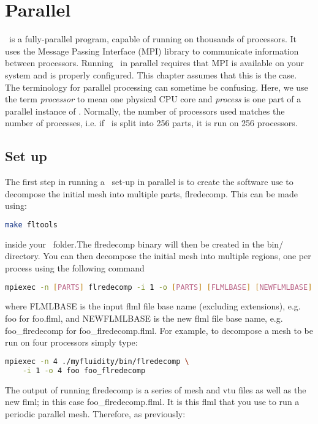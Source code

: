 \chapter{Parallel}

\fluidity\ is a fully-parallel program, capable of running on thousands of processors. 
It uses the Message Passing Interface (MPI) library to communicate information between 
processors. Running \fluidity\ in parallel requires that MPI is available on your system
and is properly configured. This chapter assumes that this is the case. The 
terminology for parallel processing can sometime be confusing. Here, we use the 
term \emph{processor} to mean one physical CPU core and \emph{process} is one part
of a parallel instance of \fluidity. Normally, the number of processors used matches
the number of processes, i.e. if \fluidity\ is split into 256 parts, it is run on 256 processors.

\section{Set up}

The first step in running a \fluidity\ set-up in parallel is to create the software
use to decompose the initial mesh into multiple parts, flredecomp. This can be made using:
\begin{lstlisting}[language=bash]
make fltools
\end{lstlisting}
inside your \fluidity\ folder.The flredecomp binary will then be created in the bin/ directory. 
You can then decompose the initial mesh into multiple regions, one per process using the following command
\begin{lstlisting}[language=bash]
mpiexec -n [PARTS] flredecomp -i 1 -o [PARTS] [FLMLBASE] [NEWFLMLBASE]
\end{lstlisting}
where FLMLBASE is the \fluidity input flml file base name (excluding
extensions), e.g. foo for foo.flml, and NEWFLMLBASE is the new flml
file base name, e.g. foo\_flredecomp for foo\_flredecomp.flml.  For
example, to decompose a mesh to be run on four processors
simply type:

\begin{lstlisting}[language=bash]
mpiexec -n 4 ./myfluidity/bin/flredecomp \
    -i 1 -o 4 foo foo_flredecomp
\end{lstlisting}

The output of running flredecomp is a series of mesh and vtu files as well as the new flml; in this case foo\_flredecomp.flml. It is this flml that you use to run a periodic parallel mesh. Therefore, as previously:

